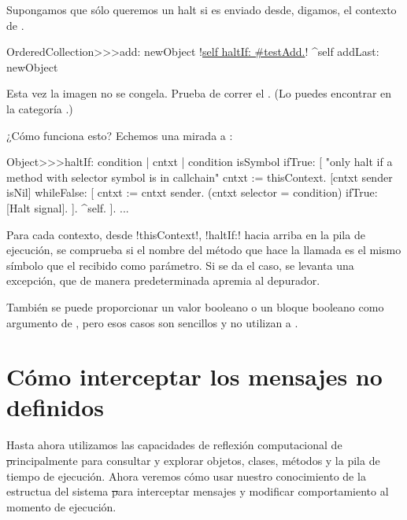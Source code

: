 \documentclass[a4paper,10pt,twoside]{book}
\begin{document}
Supongamos que sólo queremos un halt si  es enviado desde,
digamos, el contexto de .

\begin{code}{}
OrderedCollection>>>add: newObject
        !\underline{self haltIf: \#testAdd.}!
        ^self addLast: newObject
\end{code}

Esta vez la imagen no se congela.  Prueba de correr el
.  (Lo puedes encontrar en la categoría
.) 

¿Cómo funciona esto?  Echemos una mirada a
: 
\begin{code}{}
Object>>>haltIf: condition
        | cntxt |
        condition isSymbol ifTrue: [
                "only halt if a method with selector symbol is in callchain"
                cntxt := thisContext.
                [cntxt sender isNil] whileFalse: [
                        cntxt := cntxt sender.
                        (cntxt selector = condition) ifTrue: [Halt signal]. ].
                ^self.
        ].
        ...
\end{code}

Para cada contexto, desde \ct!thisContext!, \ct!haltIf:! hacia arriba
en la pila de ejecución, se comprueba si el nombre del método que hace
la llamada es el mismo símbolo que el recibido como parámetro.  Si se
da el caso, se levanta una excepción, que de manera predeterminada
apremia al depurador.

También se puede proporcionar un valor booleano o un bloque booleano
como argumento de , pero esos casos son sencillos y no
utilizan a .

\section{Cómo interceptar los mensajes no definidos}

Hasta ahora utilizamos las capacidades de reflexión computacional de
\st principalmente para consultar y explorar objetos, clases, métodos
y la pila de tiempo de ejecución.  Ahora veremos cómo usar nuestro
conocimiento de la estructua del sistema \st para interceptar mensajes
y modificar comportamiento al momento de ejecución.
\end{document}
